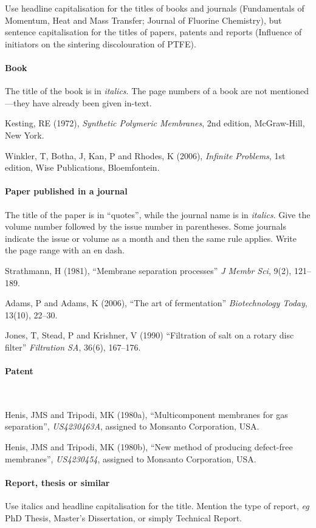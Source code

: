 \documentclass[a5paper, 10pt]{article}
\begin{document}
Use headline capitalisation for the titles of books and journals (Fundamentals 
of Momentum, Heat and Mass Transfer; Journal of Fluorine Chemistry), but 
sentence capitalisation for the titles of papers, patents and reports 
(Influence of initiators on the sintering discolouration of PTFE).

\paragraph{Book}
The title of the book is in \emph{italics}. The page numbers of a book are not mentioned---they have already been given in-text. 

Kesting, RE (1972), \textit{Synthetic Polymeric Membranes}, 2nd edition,
  McGraw-Hill, New York.

Winkler, T, Botha, J, Kan, P and Rhodes, K (2006),
  \textit{Infinite Problems}, 1st edition, Wise Publications, Bloemfontein.

\paragraph{Paper published in a journal}
The title of the paper is in ``quotes'', while the journal name is in \emph{italics}. Give the volume number followed by the issue number in parentheses. Some journals indicate the issue or volume as a month and then the same rule applies. Write the page range with an en dash.

Strathmann, H (1981), ``Membrane separation processes''
  \textit{J  Membr  Sci}, 9(2), 121--189.

Adams, P and Adams, K (2006), ``The art of fermentation''
  \textit{Biotechnology Today}, 13(10), 22--30.

Jones, T, Stead, P and Krishner, V (1990) ``Filtration of salt
  on a rotary disc filter'' \textit{Filtration SA}, 36(6), 167--176.

\paragraph{Patent}
~

Henis, JMS and Tripodi, MK  (1980a), ``Multicomponent membranes
for gas separation'', \textit{US4230463A}, assigned to Monsanto
Corporation, USA.

Henis, JMS and Tripodi, MK (1980b), ``New method of producing
  defect-free membranes'', \textit{US4230454}, assigned to
  Monsanto Corporation, USA.

\paragraph{Report, thesis or similar}
Use italics and headline capitalisation for the title. Mention the type of 
report, \textit{eg} PhD Thesis, Master's Dissertation, or simply Technical Report.
\end{document}

